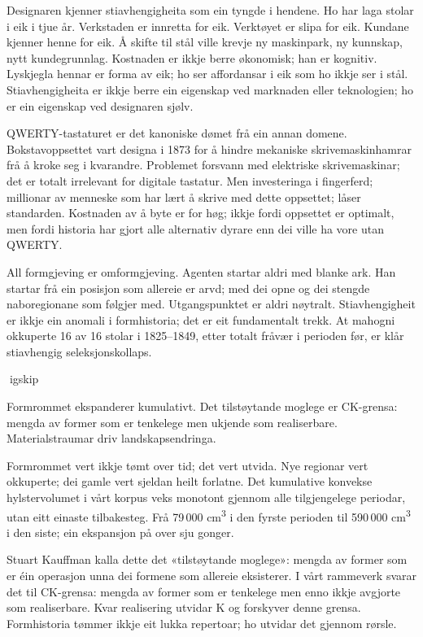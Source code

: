 Designaren kjenner stiavhengigheita som ein tyngde i hendene. Ho har laga stolar i eik i tjue år. Verkstaden er innretta for eik. Verktøyet er slipa for eik. Kundane kjenner henne for eik. Å skifte til stål ville krevje ny maskinpark, ny kunnskap, nytt kundegrunnlag. Kostnaden er ikkje berre økonomisk; han er kognitiv. Lyskjegla hennar er forma av eik; ho ser affordansar i eik som ho ikkje ser i stål. Stiavhengigheita er ikkje berre ein eigenskap ved marknaden eller teknologien; ho er ein eigenskap ved designaren sjølv.

QWERTY-tastaturet er det kanoniske dømet frå ein annan domene. Bokstavoppsettet vart designa i 1873 for å hindre mekaniske skrivemaskinhamrar frå å kroke seg i kvarandre. Problemet forsvann med elektriske skrivemaskinar; det er totalt irrelevant for digitale tastatur. Men investeringa i fingerferd; millionar av menneske som har lært å skrive med dette oppsettet; låser standarden. Kostnaden av å byte er for høg; ikkje fordi oppsettet er optimalt, men fordi historia har gjort alle alternativ dyrare enn dei ville ha vore utan QWERTY.

All formgjeving er omformgjeving. Agenten startar aldri med blanke ark. Han startar frå ein posisjon som allereie er arvd; med dei opne og dei stengde naboregionane som følgjer med. Utgangspunktet er aldri nøytralt. Stiavhengigheit er ikkje ein anomali i formhistoria; det er eit fundamentalt trekk. At mahogni okkuperte 16 av 16 stolar i 1825--1849, etter totalt fråvær i perioden før, er klår stiavhengig seleksjonskollaps.

igskip

Formrommet ekspanderer kumulativt. Det tilstøytande moglege er CK-grensa: mengda av former som er tenkelege men ukjende som realiserbare. Materialstraumar driv landskapsendringa.

Formrommet vert ikkje tømt over tid; det vert utvida. Nye regionar vert okkuperte; dei gamle vert sjeldan heilt forlatne. Det kumulative konvekse hylstervolumet i vårt korpus veks monotont gjennom alle tilgjengelege periodar, utan eitt einaste tilbakesteg. Frå 79\,000 cm\textsuperscript{3} i den fyrste perioden til 590\,000 cm\textsuperscript{3} i den siste; ein ekspansjon på over sju gonger.

Stuart Kauffman kalla dette det «tilstøytande moglege»: mengda av former som er éin operasjon unna dei formene som allereie eksisterer. I vårt rammeverk svarar det til CK-grensa: mengda av former som er tenkelege men enno ikkje avgjorte som realiserbare. Kvar realisering utvidar K og forskyver denne grensa. Formhistoria tømmer ikkje eit lukka repertoar; ho utvidar det gjennom rørsle.

